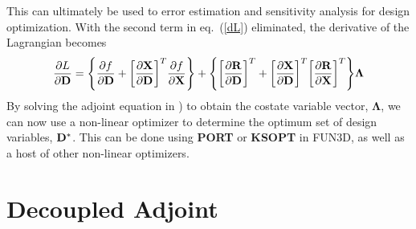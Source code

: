 \documentclass{article}   	%
\begin{document}
This can ultimately be used to error estimation and sensitivity analysis for
design optimization.  With the second term in eq.~(\ref{dL}) eliminated, the
derivative of the Lagrangian becomes
\begin{equation}
  \frac{\partial L}{\partial \mathbf D}=
  \Bigg\{\frac{\partial f}{\partial \mathbf D}+\bigg[\frac{\partial \mathbf X}{\partial
  \mathbf D}\bigg]^T \frac{\partial f}{\partial \mathbf X}\Bigg\}
  +\Bigg\{\bigg[\frac{\partial \mathbf R}{\partial \mathbf D}\bigg]^T
  +\bigg[\frac{\partial \mathbf X}{\partial \mathbf D}\bigg]^T\bigg[\frac{\partial
  \mathbf R}{\partial \mathbf X}\bigg]^T\Bigg\}\mathbf{\Lambda}
  \label{obj_function}
\end{equation}
By solving the adjoint equation in ) to obtain the costate
variable vector, $\mathbf{\Lambda}$, we can now use a non-linear optimizer to
determine the optimum set of design variables, $\mathbf D^*$. This can be done using
{\bf PORT} or {\bf KSOPT} in FUN3D, as well as a host of other non-linear
optimizers.

\section{Decoupled Adjoint}
\end{document}
